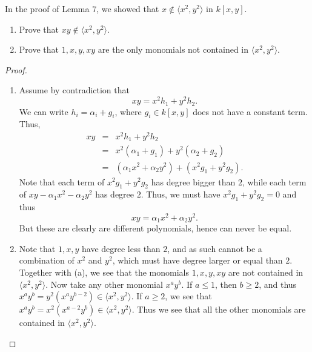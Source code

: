 \begin{exercise}{17}
In the proof of Lemma $7$, we showed that $x\notin \langle x^2,y^2\rangle$ in $k[x,y]$.
\begin{enumerate}
    \item Prove that $xy\notin \langle x^2,y^2\rangle$.
    \item Prove that $1, x, y, xy$ are the only monomials not contained in $\langle x^2, y^2\rangle$.
\end{enumerate}
\end{exercise}
\begin{proof}
    \begin{enumerate}
        \item Assume by contradiction that
        $$xy = x^2 h_1 + y^2 h_2.$$
        We can write $h_i = \alpha_i + g_i$, where $g_i\in k[x,y]$ does not have a constant term. Thus,
        \begin{eqnarray*}
            xy
            & = & x^2 h_1 + y^2 h_2\\
            & = & x^2 (\alpha_1 + g_1) + y^2 (\alpha_2 + g_2)\\
            & = & (\alpha_1 x^2 + \alpha_2 y^2) + (x^2 g_1 + y^2 g_2).
        \end{eqnarray*}
        Note that each term of $x^2 g_1 + y^2 g_2$ has degree bigger than $2$, while each term of $xy - \alpha_1 x^2 - \alpha_2 y^2$ has degree $2$. Thus, we must have $x^2 g_1 + y^2 g_2 = 0$ and thus
        $$xy = \alpha_1 x^2 + \alpha_2 y^2.$$
        But these are clearly are different polynomials, hence can never be equal.
        \item Note that $1,x,y$ have degree less than $2$, and as such cannot be a combination of $x^2$ and $y^2$, which must have degree larger or equal than $2$. Together with (a), we see that the monomials $1,x,y,xy$ are not contained in $\langle x^2, y^2\rangle$. Now take any other monomial $x^a y^b$. If $a\leq 1$, then $b\geq 2$, and thus $x^a y^b = y^2 (x^a y^{b-2})\in \langle x^2,y^2\rangle$. If $a\geq 2$, we see that $x^a y^b = x^2 (x^{a-2} y^b)\in \langle x^2, y^2\rangle$. Thus we see that all the other monomials are contained in $\langle x^2, y^2\rangle$.
    \end{enumerate}
\end{proof}

